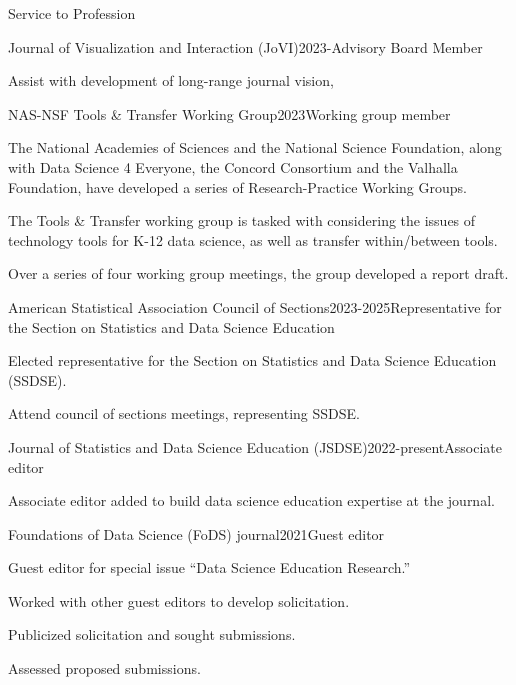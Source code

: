 \documentclass{resume} %
\begin{document}
\begin{rSection}{Service to Profession}

\begin{rSubsection}{Journal of Visualization and Interaction (JoVI)}{}{2023-}{Advisory Board Member}
\item Assist with development of long-range journal vision, 
\end{rSubsection}

\begin{rSubsection}{NAS-NSF Tools \& Transfer Working Group}{}{2023}{Working group member}
\item The National Academies of Sciences and the National Science Foundation, along with Data Science 4 Everyone, the Concord Consortium and the Valhalla Foundation, have developed a series of Research-Practice Working Groups.
\item The Tools \& Transfer working group is tasked with considering the issues of technology tools for K-12 data science, as well as transfer within/between tools.
\item Over a series of four working group meetings, the group developed a report draft.
\end{rSubsection}

\begin{rSubsection}{American Statistical Association Council of Sections}{}{2023-2025}{Representative for the Section on Statistics and Data Science Education}
\item Elected representative for the Section on Statistics and Data Science Education (SSDSE).
\item Attend council of sections meetings, representing SSDSE. 
\end{rSubsection}

\begin{rSubsection}{Journal of Statistics and Data Science Education (JSDSE)}{}{2022-present}{Associate editor}
\item Associate editor added to build data science education expertise at the journal.
\end{rSubsection}

\begin{rSubsection}{Foundations of Data Science (FoDS) journal}{}{2021}{Guest editor}
\item Guest editor for special issue ``Data Science Education Research.''
\item Worked with other guest editors to develop solicitation.
\item Publicized solicitation and sought submissions.
\item Assessed proposed submissions.
\end{rSubsection}


\end{rSection}
\end{document}
